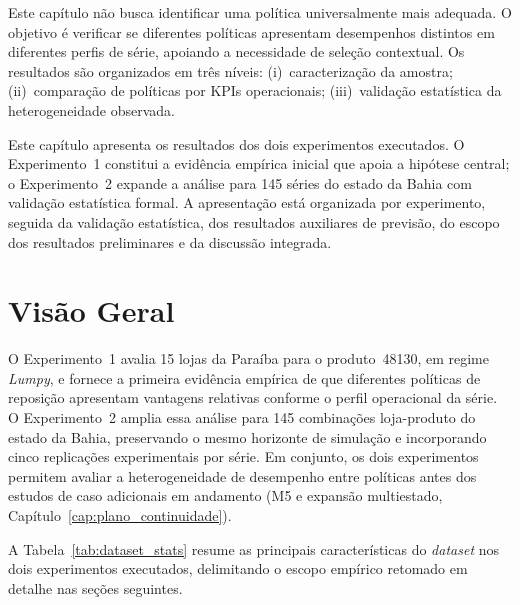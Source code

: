 ﻿

\noindent Este capítulo não busca identificar uma política universalmente mais adequada. O objetivo é verificar se diferentes políticas apresentam desempenhos distintos em diferentes perfis de série, apoiando a necessidade de seleção contextual. Os resultados são organizados em três níveis: (i)~caracterização da amostra; (ii)~comparação de políticas por KPIs operacionais; (iii)~validação estatística da heterogeneidade observada.

Este capítulo apresenta os resultados dos dois experimentos executados. O Experimento~1 constitui a evidência empírica inicial que apoia a hipótese central; o Experimento~2 expande a análise para 145 séries do estado da Bahia com validação estatística formal. A apresentação está organizada por experimento, seguida da validação estatística, dos resultados auxiliares de previsão, do escopo dos resultados preliminares e da discussão integrada.

\section{Visão Geral}

O Experimento~1 avalia 15 lojas da Paraíba para o produto~48130, em regime \textit{Lumpy}, e fornece a primeira evidência empírica de que diferentes políticas de reposição apresentam vantagens relativas conforme o perfil operacional da série. O Experimento~2 amplia essa análise para 145 combinações loja-produto do estado da Bahia, preservando o mesmo horizonte de simulação e incorporando cinco replicações experimentais por série. Em conjunto, os dois experimentos permitem avaliar a heterogeneidade de desempenho entre políticas antes dos estudos de caso adicionais em andamento (M5 e expansão multiestado, Capítulo~\ref{cap:plano_continuidade}).

A Tabela~\ref{tab:dataset_stats} resume as principais características do \textit{dataset} nos dois experimentos executados, delimitando o escopo empírico retomado em detalhe nas seções seguintes.

